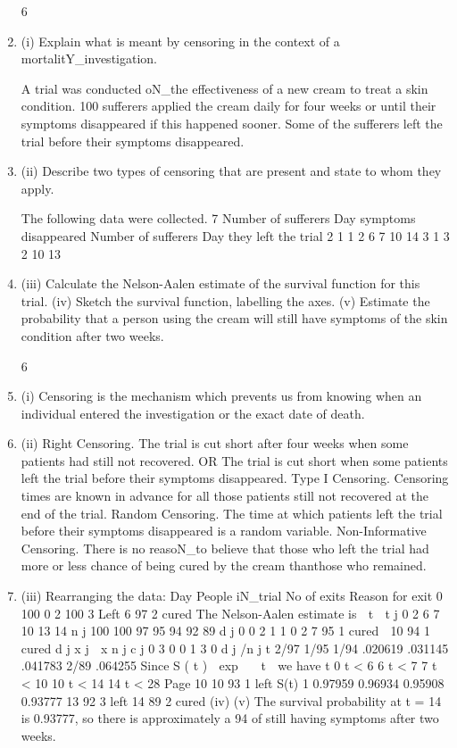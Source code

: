 \documentclass[a4paper,12pt]{article}
\begin{document}
\begin{enumerate}

6
\item (i)
Explain what is meant by censoring in the context of a mortalitY_investigation.

A trial was conducted oN_the effectiveness of a new cream to treat a skin condition.
100 sufferers applied the cream daily for four weeks or until their symptoms
disappeared if this happened sooner. Some of the sufferers left the trial before their
symptoms disappeared.
\item (ii)
Describe two types of censoring that are present and state to whom they apply.

The following data were collected.
7
Number of
sufferers Day symptoms
disappeared Number of
sufferers Day they left
the trial
2
1
1
2 6
7
10
14 3
1
3 2
10
13
\item (iii) Calculate the Nelson-Aalen estimate of the survival function for this trial. 
(iv) Sketch the survival function, labelling the axes.
(v) Estimate the probability that a person using the cream will still have symptoms
of the skin condition after two weeks.


6
\item (i) Censoring is the mechanism which prevents us from knowing when an individual
entered the investigation or the exact date of death.
\item (ii) Right Censoring. The trial is cut short after four weeks when some patients had still
not recovered.
OR
The trial is cut short when some patients left the trial before their symptoms
disappeared.
Type I Censoring. Censoring times are known in advance for all those patients still
not recovered at the end of the trial.
Random Censoring. The time at which patients left the trial before their symptoms disappeared is a random variable.
Non-Informative Censoring. There is no reasoN_to believe that those who left the trial had more or less chance of being cured by the cream thanthose who remained.
\item (iii)
Rearranging the data:
Day
People iN_trial
No of exits
Reason for exit
0
100
0
2
100
3
Left
6
97
2
cured
The Nelson-Aalen estimate is  t 
t j
0
2
6
7
10
13
14
n j
100
100
97
95
94
92
89
d j
0
0
2
1
1
0
2
7
95
1
cured

10
94
1
cured
d j
x j  x
n j
c j
0
3
0
0
1
3
0
d j /n j \lambda t
2/97
1/95
1/94 .020619
.031145
.041783
2/89 .064255
Since S ( t )  exp   t  we have
t
0 \leq t < 6
6 \leq t < 7
7 \leq t < 10
10 \leq t < 14
14 \leq t < 28
Page 10
10
93
1
left
S(t)
1
0.97959
0.96934
0.95908
0.93777
13
92
3
left
14
89
2
cured%
(iv)
(v)
The survival probability at t = 14 is 0.93777, so there is approximately a 94%
of still having symptoms after two weeks.


\end{enumerate}
\end{document}
